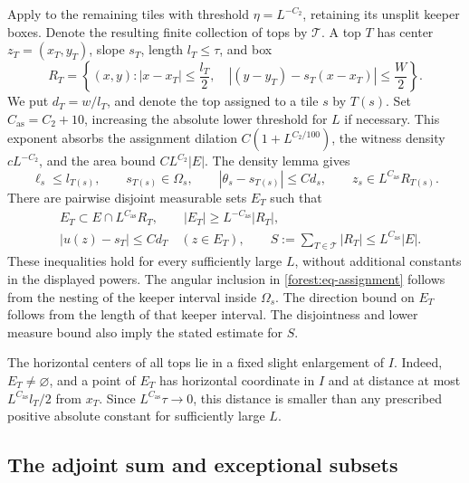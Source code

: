 Apply  to the remaining tiles with threshold
\(\eta=L^{-C_2}\), retaining its unsplit keeper boxes. Denote
the resulting finite collection of tops by \(\mathcal T\).
A top \(T\) has center \(z_T=(x_T,y_T)\), slope \(s_T\),
length \(l_T\le\tau\), and box
\[
 R_T=\left\{(x,y): |x-x_T|\le\frac{l_T}{2},\quad
 |(y-y_T)-s_T(x-x_T)|\le\frac W2\right\}.
\]
We put \(d_T=w/l_T\), and denote the top assigned to a tile \(s\)
by \(T(s)\). Set \(C_{\mathrm{as}}=C_2+10\), increasing the
absolute lower threshold for \(L\) if necessary. This exponent
absorbs the assignment dilation
\(C(1+L^{C_2/100})\), the witness density
\(cL^{-C_2}\), and the area bound \(CL^{C_2}|E|\).
The density lemma gives
\begin{equation}\label{forest:eq-assignment}
 \ell_s\le l_{T(s)},\qquad s_{T(s)}\in\Omega_s,\qquad
 |\theta_s-s_{T(s)}|\le C d_s,\qquad
 z_s\in L^{C_{\mathrm{as}}}R_{T(s)}.
\end{equation}
There are pairwise disjoint measurable sets \(E_T\) such that
\begin{equation}\label{forest:eq-witnesses}
 \begin{split}
 &E_T\subset E\cap L^{C_{\mathrm{as}}}R_T,
 \qquad |E_T|\ge L^{-C_{\mathrm{as}}}|R_T|,\\
 &|u(z)-s_T|\le C d_T\quad(z\in E_T),\qquad
 S:=\sum_{T\in\mathcal T}|R_T|
       \le L^{C_{\mathrm{as}}}|E|.
 \end{split}
\end{equation}
These inequalities hold for every sufficiently large \(L\),
without additional constants in the displayed powers. The angular inclusion in
\eqref{forest:eq-assignment} follows from the nesting of the keeper
interval inside \(\Omega_s\). The direction bound on \(E_T\)
follows from the length of that keeper interval. The disjointness and
lower measure bound also imply the stated estimate for \(S\).

The horizontal centers of all tops lie in a fixed slight enlargement
of \(I\). Indeed, \(E_T\ne\varnothing\), and a point of
\(E_T\) has horizontal coordinate in \(I\) and at distance at
most \(L^{C_{\mathrm{as}}}l_T/2\) from \(x_T\). Since
\(L^{C_{\mathrm{as}}}\tau\to0\), this distance is smaller
than any prescribed positive absolute constant for sufficiently large
\(L\).

\subsection{The adjoint sum and exceptional subsets}


